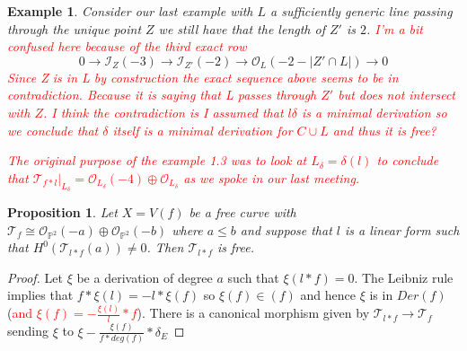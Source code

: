 \documentclass{article}
\newtheorem{example}{Example}[section]
\newtheorem{proposition}[theorem]{Proposition}
\begin{document}
\begin{example}
    Consider our last example with $L$ a sufficiently generic line passing through the unique point $Z$ we still have that the length of $Z'$ is $2$.
    \textcolor{red}{I'm a bit confused here because of the third exact row}
    \begin{equation}
        0 \to \mathcal{I}_Z(-3) \to \mathcal{I}_{Z'}(-2) \to \mathcal{O}_L(-2-|Z'\cap L|) \to 0
    \end{equation}
    \textcolor{red}{Since Z is in L by construction the exact sequence above seems to be in contradiction. Because it is saying that L passes through $Z'$ but does not intersect with $Z$. I think the contradiction is I assumed that $l\delta$ is a minimal derivation so we conclude that $\delta$ itself is a minimal derivation for $C \cup L$ and thus it is free?}

    \textcolor{red}{The original purpose of the example 1.3 was to look at $L_{\delta} = \delta(l)$ to conclude that $\mathcal{T}_{f*l}|_{L_{\delta}} = \mathcal{O}_{L_{\delta}}(-4) \oplus \mathcal{O}_{L_{\delta}}$ as we spoke in our last meeting.}
\end{example}

\begin{proposition}
    Let $X = V(f)$ be a free curve with $\mathcal{T}_f \cong \mathcal{O}_{\mathbb{P}^2}(-a) \oplus \mathcal{O}_{\mathbb{P}^2}(-b)$ where $a \leq b$ and suppose that $l$ is a linear form such that $H^0(\mathcal{T}_{l*f}(a)) \not = 0$. Then $\mathcal{T}_{l*f}$ is free.
\end{proposition}
\begin{proof}
    Let $\xi$ be a derivation of degree $a$ such that $\xi(l*f) = 0$. The Leibniz rule implies that $f*\xi(l) = -l*\xi(f)$ so $\xi(f) \in (f)$ and hence $\xi$ is in $Der(f)$ (\textcolor{red}{and $\xi(f) = -\frac{\xi(l)}{l}*f$}). There is a canonical morphism given by $\mathcal{T}_{l*f} \to \mathcal{T}_{f}$ sending $\xi$ to $\xi - \frac{\xi(f)}{f*deg(f)}*\delta_E$
\end{proof}
\end{document}
